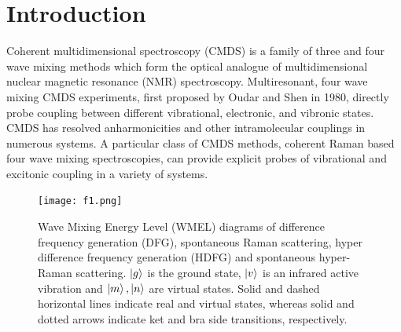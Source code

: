 \documentclass[aip, jcp, reprint, onecolumn]{revtex4-2}
\begin{document}
\section{Introduction}
Coherent multidimensional spectroscopy (CMDS) is a family of three and four wave mixing methods which form the optical analogue of multidimensional nuclear magnetic resonance (NMR) spectroscopy.\cite{Cho2008, RN335}
Multiresonant, four wave mixing CMDS experiments, first proposed by Oudar and Shen in 1980,\cite{RN307} directly probe coupling between different vibrational, electronic, and vibronic states. \cite{RN307, RN281, RN342, Cho2008, RN335, Ogilvie2019, RN325} 
CMDS has resolved anharmonicities and other intramolecular couplings in numerous systems. \cite{RN345, RN342, RN343, RN324, RN329, RN120, Czech2015, Gaynor2017, Ogilvie2019, RN325}
A particular class of CMDS methods, coherent Raman based four wave mixing spectroscopies, can provide explicit probes of vibrational and excitonic coupling in a variety of systems.

\begin{figure}[!htbp]
	\centering
	\texttt{[image: f1.png]}
	\caption{Wave Mixing Energy Level (WMEL) diagrams of difference frequency generation (DFG), spontaneous Raman scattering, hyper difference frequency generation (HDFG) and spontaneous hyper-Raman scattering. \cite{RN286, RN352}
		$\ket{g}$ is the ground state, $\ket{v}$ is an infrared active vibration and $\ket{m}, \ket{n}$ are virtual states.
		Solid and dashed horizontal lines indicate real and virtual states, whereas solid and dotted arrows indicate ket and bra side transitions, respectively. %
		}
	\label{fig:comparisonwmel}
\end{figure}
\end{document}

